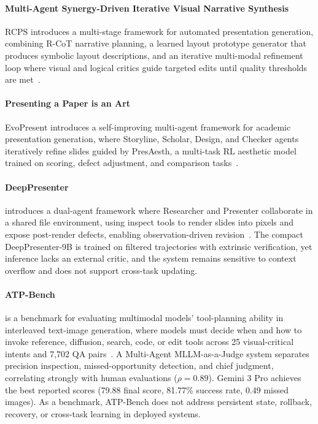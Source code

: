 \paragraph{Multi-Agent Synergy-Driven Iterative Visual Narrative Synthesis}
RCPS introduces a multi-stage framework for automated presentation generation, combining R-CoT narrative planning, a learned layout prototype generator that produces symbolic layout descriptions, and an iterative multi-modal refinement loop where visual and logical critics guide targeted edits until quality thresholds are met~\cite{avg250713285}.

\paragraph{Presenting a Paper is an Art}
EvoPresent introduces a self-improving multi-agent framework for academic presentation generation, where Storyline, Scholar, Design, and Checker agents iteratively refine slides guided by PresAesth, a multi-task RL aesthetic model trained on scoring, defect adjustment, and comparison tasks~\cite{avg251005571}. 

\paragraph{DeepPresenter}
 introduces a dual-agent framework where Researcher and Presenter collaborate in a shared file environment, using inspect tools to render slides into pixels and expose post-render defects, enabling observation-driven revision~\cite{zheng2026deeppresenter}. The compact DeepPresenter-9B is trained on filtered trajectories with extrinsic verification, yet inference lacks an external critic, and the system remains sensitive to context overflow and does not support cross-task updating.

\paragraph{ATP-Bench}
 is a benchmark for evaluating multimodal models' tool-planning ability in interleaved text-image generation, where models must decide when and how to invoke reference, diffusion, search, code, or edit tools across 25 visual-critical intents and 7,702 QA pairs~\cite{avg260329902}. A Multi-Agent MLLM-as-a-Judge system separates precision inspection, missed-opportunity detection, and chief judgment, correlating strongly with human evaluations ($\rho=0.89$). Gemini 3 Pro achieves the best reported scores (79.88 final score, 81.77\% success rate, 0.49 missed images). As a benchmark, ATP-Bench does not address persistent state, rollback, recovery, or cross-task learning in deployed systems. 

